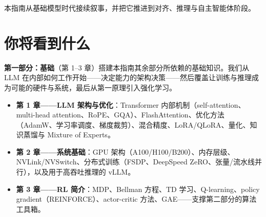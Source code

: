 \documentclass[11pt,a4paper,openany]{book}
\begin{document}
本指南从基础模型时代接续叙事，并把它推进到对齐、推理与自主智能体阶段。

\section*{你将看到什么}
\label{what-you-should-expect}

\textbf{第一部分：基础}（第 1--3 章）搭建本指南其余部分所依赖的基础知识。我们从 LLM 在内部如何工作开始——决定能力的架构决策——然后覆盖让训练与推理成为可能的硬件与系统，最后从第一原理引入强化学习。

\begin{itemize}
  \item \textbf{第 1 章——LLM 架构与优化}：Transformer 内部机制（self-attention、multi-head attention、RoPE、GQA）、FlashAttention、优化方法（AdamW、学习率调度、梯度裁剪）、混合精度、LoRA/QLoRA、量化、知识蒸馏与 Mixture of Experts。
  \item \textbf{第 2 章——系统基础}：GPU 架构（A100/H100/B200）、内存层级、NVLink/NVSwitch、分布式训练（FSDP、DeepSpeed ZeRO、张量/流水线并行），以及用于高吞吐推理的 vLLM。
  \item \textbf{第 3 章——RL 简介}：MDP、Bellman 方程、TD 学习、Q-learning、policy gradient（REINFORCE）、actor-critic 方法、GAE——支撑第二部分的算法工具箱。
\end{itemize}
\end{document}
